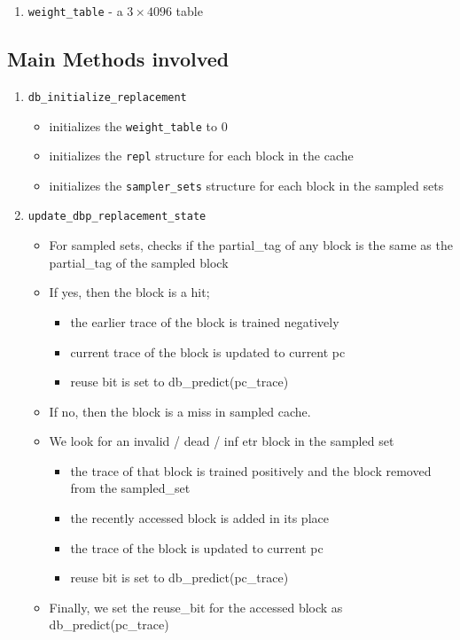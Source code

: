 \documentclass[]{article}
\begin{document}
\begin{itemize}
\begin{enumerate}
    \item \texttt{weight\_table} - a $3 \times 4096$ table
\end{enumerate}

\subsection{Main Methods involved}
    \begin{enumerate}
        \item \texttt{db\_initialize\_replacement}
                \begin{itemize}
                    \item initializes the \texttt{weight\_table} to 0
                    \item initializes the \texttt{repl} structure for each block in the cache
                    \item initializes the \texttt{sampler\_sets} structure for each block in the sampled sets
                \end{itemize}
        
        \item \texttt{update\_dbp\_replacement\_state}
                \begin{itemize}
                    \item For sampled sets, checks if the partial\_tag of any block is the same as the partial\_tag of the sampled block
                    \item If yes, then the block is a hit; 
                        \begin{itemize}
                            \item the earlier trace of the block is trained negatively
                            \item current trace of the block is updated to current pc
                            \item reuse bit is set to db\_predict(pc\_trace)
                        \end{itemize}
                    \item If no, then the block is a miss in sampled cache.
                    \item We look for an invalid / dead / inf etr block in the sampled set
                        \begin{itemize}
                            \item the trace of that block is trained positively and the block removed from the sampled\_set
                            \item the recently accessed block is added in its place
                            \item the trace of the block is updated to current pc
                            \item reuse bit is set to db\_predict(pc\_trace)
                        \end{itemize}
                    \item Finally, we set the reuse\_bit for the accessed block as db\_predict(pc\_trace)
                \end{itemize}


\end{enumerate}
\end{itemize}
\end{document}
